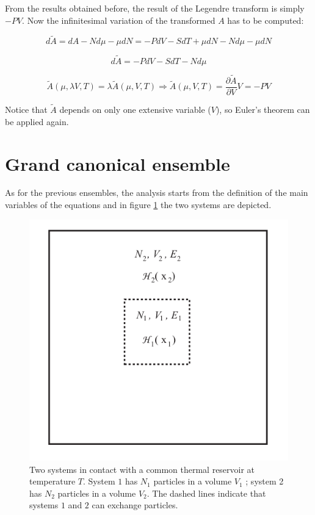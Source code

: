 	From the results obtained before, the result of the Legendre transform is simply $-PV$.
	Now the infinitesimal variation of the transformed $A$ has to be computed:

	$$d\tilde{A} = dA - Nd \mu -\mu dN = -PdV - SdT + \mu dN -Nd\mu - \mu dN$$

	$$d\tilde{A} = -PdV - SdT - Nd\mu$$

	$$\tilde{A}(\mu, \lambda V, T) = \lambda\tilde{A}(\mu, V, T)\Rightarrow \tilde{A}(\mu, V, T) = \frac{\partial \tilde{A}}{\partial V}V = -PV$$

	Notice that $\tilde{A}$ depends on only one extensive variable ($V$), so Euler's theorem can be applied again.


\section{Grand canonical ensemble}
As for the previous ensembles, the analysis starts from the definition of the main variables of the equations and in figure \ref{fig:grand} the two systems are depicted.

\begin{figure}[H]
\center
\includegraphics[scale=0.5]{grand.png}
\caption{Two systems in contact with a common thermal reservoir at temperature $T$. System $1$ has $N_1$ particles in a volume $V_1$ ; system 2 has $N_2$ particles in a volume $V_2$. The dashed lines indicate that systems $1$ and $2$ can exchange particles.}
\label{fig:grand}
\end{figure}


